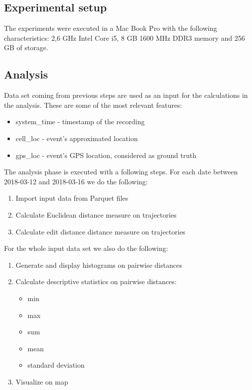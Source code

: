 \subsection{Experimental setup}
The experiments were executed in a Mac Book Pro with the following characteristics: 2,6 GHz Intel Core i5, 8 GB 1600 MHz DDR3 memory and 256 GB of storage.

\subsection{Analysis}
Data set coming from previous steps are used as an input for the calculations in the analysis. These are some of the most relevant features:
\begin{itemize}
    \item system\_time - timestamp of the recording
    \item cell\_loc - event's approximated location
    \item gps\_loc - event's GPS location, considered as ground truth
\end{itemize}

The analysis phase is executed with a following steps. For each date between 2018-03-12 and 2018-03-16 we do the following:
\begin{enumerate}
    \item Import input data from Parquet files
    \item Calculate Euclidean distance measure on trajectories
    \item Calculate edit distance distance measure on trajectories
\end{enumerate}

For the whole input data set we also do the following:
\begin{enumerate}
   \item Generate and display histograms on pairwise distances
    \item Calculate descriptive statistics on pairwise distances:
        \begin{itemize}
            \item min
            \item max
            \item sum
            \item mean
            \item standard deviation
        \end{itemize}
    \item Visualize on map
\end{enumerate}
